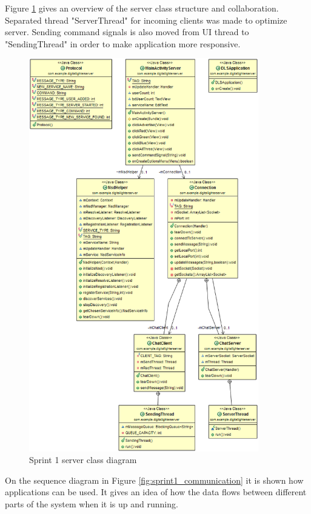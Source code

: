 Figure \ref{fig:class_diagram_server} gives an overview of the server class structure and collaboration. Separated thread "ServerThread" for incoming clients was made to optimize server. Sending command signals is also moved from UI thread to "SendingThread" in order to make application more responsive.

\begin{figure}[H]
	\centering
		\includegraphics[width=10cm]{sprint1/class_diagram_server.png}
	\caption{Sprint 1 server class diagram}
	\label{fig:class_diagram_server}
\end{figure}

On the sequence diagram in Figure \ref{fig:sprint1_communication} it is shown how applications can be used. It gives an idea of how the data flows between different parts of the system when it is up and running.

